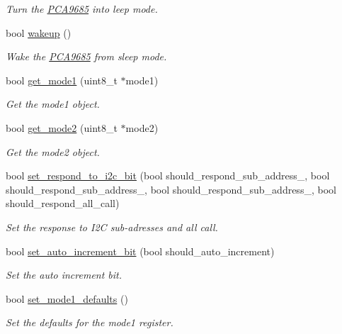 \begin{DoxyCompactItemize}
\begin{DoxyCompactList}\small\item\em Turn the \hyperlink{class_p_c_a9685}{P\+C\+A9685} into leep mode. \end{DoxyCompactList}\item 
bool \hyperlink{class_p_c_a9685_a183c1dfbe7eb9589653f9461ad6e4642}{wakeup} ()
\begin{DoxyCompactList}\small\item\em Wake the \hyperlink{class_p_c_a9685}{P\+C\+A9685} from sleep mode. \end{DoxyCompactList}\item 
bool \hyperlink{class_p_c_a9685_a891336e03b217b1ec555069dde646b7b}{get\+\_\+mode1} (uint8\+\_\+t $\ast$mode1)
\begin{DoxyCompactList}\small\item\em Get the mode1 object. \end{DoxyCompactList}\item 
bool \hyperlink{class_p_c_a9685_a36ccfb59d66ed69bb5bbdff2e4abb92f}{get\+\_\+mode2} (uint8\+\_\+t $\ast$mode2)
\begin{DoxyCompactList}\small\item\em Get the mode2 object. \end{DoxyCompactList}\item 
bool \hyperlink{class_p_c_a9685_a91e53f49fd99bc2bd4a9e95899b6e7a7}{set\+\_\+respond\+\_\+to\+\_\+i2c\+\_\+bit} (bool should\+\_\+respond\+\_\+sub\+\_\+address\+\_, bool should\+\_\+respond\+\_\+sub\+\_\+address\+\_, bool should\+\_\+respond\+\_\+sub\+\_\+address\+\_, bool should\+\_\+respond\+\_\+all\+\_\+call)
\begin{DoxyCompactList}\small\item\em Set the response to I2C sub-\/adresses and all call. \end{DoxyCompactList}\item 
bool \hyperlink{class_p_c_a9685_a0c8505ee0fe58fd866ed20399e7f4bc3}{set\+\_\+auto\+\_\+increment\+\_\+bit} (bool should\+\_\+auto\+\_\+increment)
\begin{DoxyCompactList}\small\item\em Set the auto increment bit. \end{DoxyCompactList}\item 
bool \hyperlink{class_p_c_a9685_aca492db18fc9b23e82783fb49cc897d9}{set\+\_\+mode1\+\_\+defaults} ()
\begin{DoxyCompactList}\small\item\em Set the defaults for the mode1 register. \end{DoxyCompactList}\item 

\end{DoxyCompactItemize}

